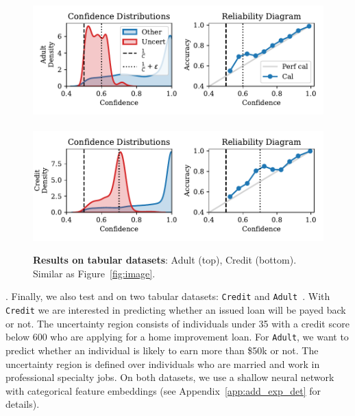 
\begin{figure}
    \centering
    \includegraphics[width=0.48\linewidth]{figs/confidential_guardian/adult_res.pdf}
    ~
    \includegraphics[width=0.48\linewidth]{figs/confidential_guardian/credit_res.pdf}
    \caption[Results on tabular datasets.]{\textbf{Results on tabular datasets}: Adult (top), Credit (bottom). Similar as Figure~\ref{fig:image}.}
    \label{fig:tabular}
\end{figure}

. Finally, we also test \attack and \name on two tabular datasets: \texttt{Credit} \citep{credit} and \texttt{Adult}~\citep{adult, ding2021retiring}. With \texttt{Credit} we are interested in predicting whether an issued loan will be payed back or not. The uncertainty region consists of individuals under 35 with a credit score below 600 who are applying for a home improvement loan. For \texttt{Adult}, we want to predict whether an individual is likely to earn more than \$50k or not. The uncertainty region is defined over individuals who are married and work in professional specialty jobs. On both datasets, we use a shallow neural network with categorical feature embeddings (see Appendix~\ref{app:add_exp_det} for details). %

